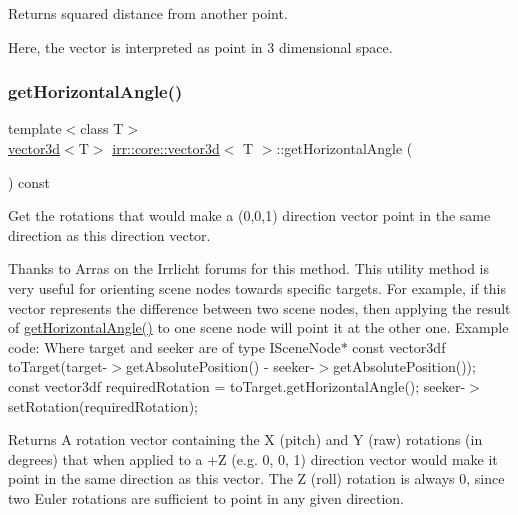 Returns squared distance from another point. 

Here, the vector is interpreted as point in 3 dimensional space. \mbox{\label{classirr_1_1core_1_1vector3d_a2c622aa988b4ea1d2e381632f99f8015}} 
\subsubsection{\texorpdfstring{get\+Horizontal\+Angle()}{getHorizontalAngle()}\hspace{0.1cm}{\footnotesize\ttfamily [1/2]}}
{\footnotesize\ttfamily template$<$class T$>$ \\
\hyperlink{classirr_1_1core_1_1vector3d}{vector3d}$<$T$>$ \hyperlink{classirr_1_1core_1_1vector3d}{irr\+::core\+::vector3d}$<$ T $>$\+::get\+Horizontal\+Angle (\begin{DoxyParamCaption}{ }\end{DoxyParamCaption}) const\hspace{0.3cm}{\ttfamily [inline]}}



Get the rotations that would make a (0,0,1) direction vector point in the same direction as this direction vector. 

Thanks to Arras on the Irrlicht forums for this method. This utility method is very useful for orienting scene nodes towards specific targets. For example, if this vector represents the difference between two scene nodes, then applying the result of \hyperlink{classirr_1_1core_1_1vector3d_a2c622aa988b4ea1d2e381632f99f8015}{get\+Horizontal\+Angle()} to one scene node will point it at the other one. Example code\+: Where target and seeker are of type I\+Scene\+Node$\ast$ const vector3df to\+Target(target-\/$>$get\+Absolute\+Position() -\/ seeker-\/$>$get\+Absolute\+Position()); const vector3df required\+Rotation = to\+Target.\+get\+Horizontal\+Angle(); seeker-\/$>$set\+Rotation(required\+Rotation);

\begin{DoxyReturn}{Returns}
A rotation vector containing the X (pitch) and Y (raw) rotations (in degrees) that when applied to a +Z (e.\+g. 0, 0, 1) direction vector would make it point in the same direction as this vector. The Z (roll) rotation is always 0, since two Euler rotations are sufficient to point in any given direction. 
\end{DoxyReturn}
\mbox{\label{classirr_1_1core_1_1vector3d_a2c622aa988b4ea1d2e381632f99f8015}} 
